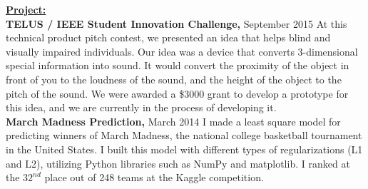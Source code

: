 \documentclass[a4paper,12pt]{article}
\begin{document}
	\vspace{7pt}
	\large\textbf{\underline{Project:}}\\
	\quad\textbf{TELUS / IEEE Student Innovation Challenge,} September 2015
	At this technical product pitch contest, we presented an idea that helps blind and visually
	impaired individuals. Our idea was a device that converts 3-dimensional special information into
	sound. It would convert the proximity of the object in front of you to the loudness of the sound, and
	the height of the object to the pitch of the sound. We were awarded a \$3000 grant to develop a
	prototype for this idea, and we are currently in the process of developing it.\\
	\vspace{5pt}
	\quad\textbf{March Madness Prediction,} March 2014
	I made a least square model for predicting winners of March Madness, the national college
	basketball tournament in the United States. I built this model with different types of regularizations
	(L1 and L2), utilizing Python libraries such as NumPy and matplotlib. I ranked at the $32^{nd}$ place out
	of 248 teams at the Kaggle competition.\\
	
	
\end{document}
